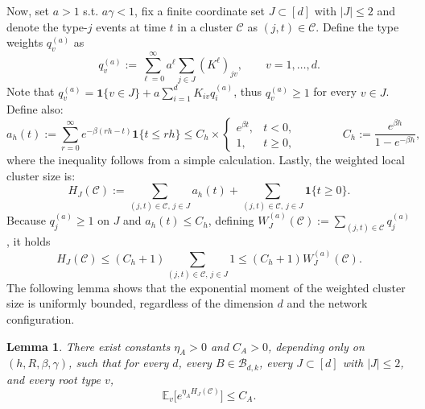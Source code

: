 \documentclass{article}
\newtheorem{lemma}{Lemma}[section]
\newcommand{\ind}{\mathbf 1}
\begin{document}
Now, set $a>1$ s.t. $a\gamma<1$, fix a finite coordinate set $J\subset[d]$ with $|J|\le 2$ and denote the type-$j$ events at time $t$ in a cluster $\mathcal C$ as $(j,t)\in\mathcal C$. Define the type weights $q_v^{(a)}$ as
\begin{equation}
\label{eq:q-weights-main}
q_v^{(a)}:=\sum_{\ell=0}^{\infty} a^{\ell}\sum_{j\in J}(K^{\ell})_{jv},
\qquad v=1,\dots,d.
\end{equation}
Note that $q_v^{(a)}=\ind\{v\in J\}+a\sum_{i=1}^d K_{iv}q_i^{(a)}$, thus $q_v^{(a)}\ge 1$ for every $v\in J$. Define also:
\begin{equation}
\label{eq:ah-bounds-main}
a_h(t):=\sum_{r=0}^{\infty} e^{-\beta(rh-t)}\textbf{1}\{t\le rh\}\le C_h\times
\begin{cases}
e^{\beta t}, & t<0,\\
1, & t\ge 0,
\end{cases}
\qquad\quad\quad
C_h:=\frac{e^{\beta h}}{1-e^{-\beta h}},
\end{equation}
where the inequality follows from a simple calculation. Lastly, the weighted local cluster size is:
\begin{equation}
\label{eq:H-cluster-main}
H_J(\mathcal C):=\sum_{(j,t)\in \mathcal C,\, j\in J} a_h(t)+\sum_{(j,t)\in \mathcal C,\, j\in J} \textbf{1}\{t\ge 0\}.
\end{equation}
Because $q_j^{(a)}\ge 1$ on $J$ and $a_h(t)\le C_h$, defining $W_J^{(a)}(\mathcal C):=\sum_{(j,t)\in \mathcal C} q_j^{(a)}$, it holds
\begin{equation}
\label{eq:H-vs-W-main}
H_J(\mathcal C)
\le (C_h+1)\sum_{(j,t)\in \mathcal C,\,j\in J}1
\le (C_h+1)W_J^{(a)}(\mathcal C).
\end{equation}
The following lemma shows that the exponential moment of the weighted cluster size is uniformly bounded, regardless of the dimension $d$ and the network configuration.
\begin{lemma}
\label{lem:A}
There exist constants $\eta_A>0$ and $C_A>0$, depending only on $(h,R,\beta,\gamma)$, such that for every $d$, every $B\in\mathcal B_{d,k}$, every $J\subset[d]$ with $|J|\le 2$, and every root type $v$,
\begin{equation}
\label{eq:lemmaA-main}
    \mathbb E_v\big[e^{\eta_A H_J(\mathcal C)}\big]\le C_A .
\end{equation}
\end{lemma}
\end{document}
